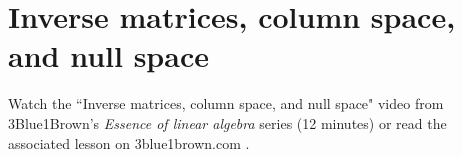 \section{Inverse matrices, column space, and null space}

Watch the ``Inverse matrices, column space, and null space" video from
3Blue1Brown's \textit{Essence of linear algebra} series (12 minutes) or read the
associated lesson on 3blue1brown.com
\cite{bib:3b1b_linalg_inverse_matrices_column_space_and_null_space}.
